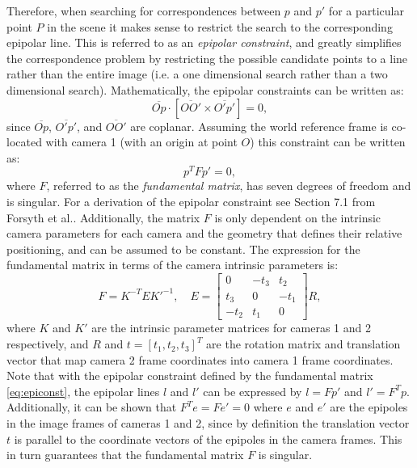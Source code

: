 Therefore, when searching for correspondences between $p$ and $p'$ for a particular point $P$ in the scene it makes sense to restrict the search to the corresponding epipolar line. This is referred to as an \textit{epipolar constraint}, and greatly simplifies the correspondence problem by restricting the possible candidate points to a line rather than the entire image (i.e. a one dimensional search rather than a two dimensional search).
Mathematically, the epipolar constraints can be written as:
\begin{equation}
\overline{Op} \cdot [\overline{OO'} \times \overline{O'p'}] = 0, 
\end{equation}
since $\overline{Op}$, $\overline{O'p'}$, and $\overline{OO'}$ are coplanar. Assuming the world reference frame is co-located with camera 1 (with an origin at point $O$) this constraint can be written as:
\begin{equation} \label{eq:epiconst}
    p^T F p'=0,
\end{equation}
where $F$, referred to as the \textit{fundamental matrix}, has seven degrees of freedom and is singular. For a derivation of the epipolar constraint see Section 7.1 from Forsyth et al.\cite[]{ForsythPonce2011}. Additionally, the matrix $F$ is only dependent on the intrinsic camera parameters for each camera and the geometry that defines their relative positioning, and can be assumed to be constant. The expression for the fundamental matrix in terms of the camera intrinsic parameters is:
\begin{equation}
    F = K^{-T}EK'^{-1}, \quad E = \begin{bmatrix}
    0 & -t_3 & t_2 \\
    t_3 & 0 & -t_1 \\
    -t_2 & t_1 & 0
    \end{bmatrix}R,
\end{equation}
where $K$ and $K'$ are the intrinsic parameter matrices for cameras 1 and 2 respectively, and $R$ and $t = [t_1, t_2, t_3]^T$ are the rotation matrix and translation vector that map camera 2 frame coordinates into camera 1 frame coordinates.
Note that with the epipolar constraint defined by the fundamental matrix \eqref{eq:epiconst}, the epipolar lines $l$ and $l'$ can be expressed by $l = Fp'$ and $l' = F^Tp$. Additionally, it can be shown that $F^Te = Fe' = 0$ where $e$ and $e'$ are the epipoles in the image frames of cameras 1 and 2, since by definition the translation vector $t$ is parallel to the coordinate vectors of the epipoles in the camera frames. This in turn guarantees that the fundamental matrix $F$ is singular.

